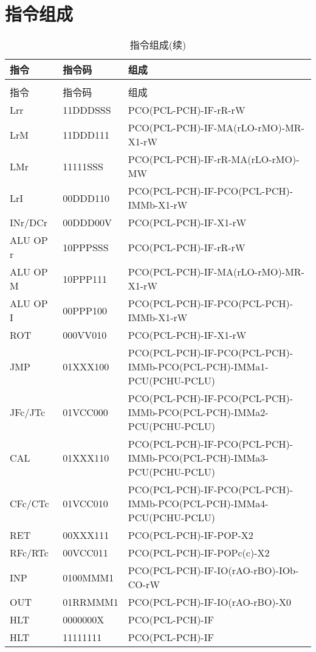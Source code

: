 \documentclass[10pt]{book}
\begin{document}
\section{指令组成}
\begin{landscape}
\begin{longtable}{|l|l|l|}
\caption{指令组成} \label{tb_ins_comb}\\
\hline
指令 & 指令码 & 组成 \\
\hline
\endfirsthead
\caption{指令组成(续)} \\
\hline
指令 & 指令码 & 组成 \\
\hline
\endhead
\hline
\endfoot
Lrr 			& 11DDDSSS & PCO(PCL-PCH)-IF-rR-rW \\
LrM				& 11DDD111 & PCO(PCL-PCH)-IF-MA(rLO-rMO)-MR-X1-rW \\
LMr				& 11111SSS & PCO(PCL-PCH)-IF-rR-MA(rLO-rMO)-MW \\
LrI				& 00DDD110 & PCO(PCL-PCH)-IF-PCO(PCL-PCH)-IMMb-X1-rW \\
\hline
INr/DCr			& 00DDD00V & PCO(PCL-PCH)-IF-X1-rW \\
\hline
ALU OP r		& 10PPPSSS & PCO(PCL-PCH)-IF-rR-rW \\
ALU OP M 		& 10PPP111 & PCO(PCL-PCH)-IF-MA(rLO-rMO)-MR-X1-rW \\
ALU OP I 		& 00PPP100 & PCO(PCL-PCH)-IF-PCO(PCL-PCH)-IMMb-X1-rW \\
ROT 			& 000VV010 & PCO(PCL-PCH)-IF-X1-rW \\
\hline
JMP				& 01XXX100 & PCO(PCL-PCH)-IF-PCO(PCL-PCH)-IMMb-PCO(PCL-PCH)-IMMa1-PCU(PCHU-PCLU) \\
JFc/JTc			& 01VCC000 & PCO(PCL-PCH)-IF-PCO(PCL-PCH)-IMMb-PCO(PCL-PCH)-IMMa2-PCU(PCHU-PCLU) \\
CAL				& 01XXX110 & PCO(PCL-PCH)-IF-PCO(PCL-PCH)-IMMb-PCO(PCL-PCH)-IMMa3-PCU(PCHU-PCLU) \\
CFc/CTc			& 01VCC010 & PCO(PCL-PCH)-IF-PCO(PCL-PCH)-IMMb-PCO(PCL-PCH)-IMMa4-PCU(PCHU-PCLU) \\
RET				& 00XXX111 & PCO(PCL-PCH)-IF-POP-X2 \\
RFc/RTc			& 00VCC011 & PCO(PCL-PCH)-IF-POPc(c)-X2 \\
\hline
INP				& 0100MMM1 & PCO(PCL-PCH)-IF-IO(rAO-rBO)-IOb-CO-rW \\
OUT				& 01RRMMM1 & PCO(PCL-PCH)-IF-IO(rAO-rBO)-X0 \\
\hline
HLT				& 0000000X & PCO(PCL-PCH)-IF \\
HLT				& 11111111 & PCO(PCL-PCH)-IF \\
\end{longtable}
\end{landscape}
\end{document}
